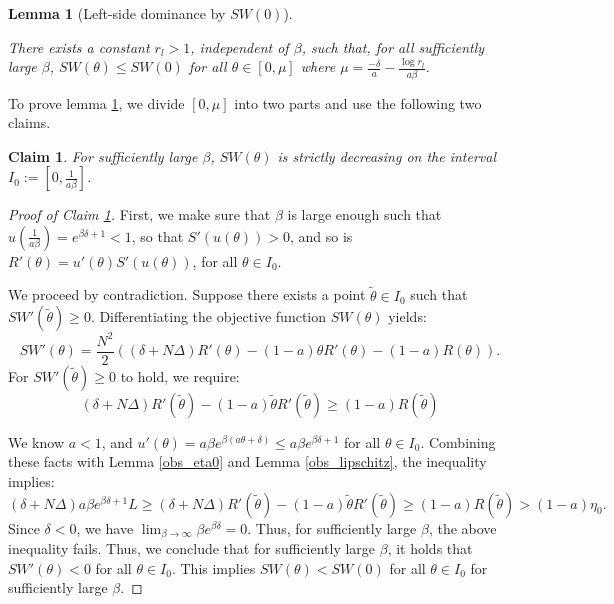 \documentclass{article}
\newtheorem{lemma}{Lemma}
\newtheorem{claim}{Claim}
\newcommand{\md}[1]{{\color{red}Hong:  #1}}
\begin{document}
\begin{lemma}[Left-side dominance by $SW(0)$]
\label{lem:lower_bound_c}

There exists a constant $r_l > 1$, independent of $\beta$, such that, for all sufficiently large $\beta$,  $SW(\theta) \le SW(0)$ for all $\theta \in [0, \mu]$ where $\mu = \frac{-\delta}{a} - \frac{\log r_l}{a\beta}$.
\end{lemma}
To prove lemma \ref{lem:lower_bound_c}, we divide $[0, \mu]$ into two parts and use the following two claims.
\begin{claim} \label{claim:decrease_near_zero}
For sufficiently large $\beta$, $SW(\theta)$ is strictly decreasing on the interval $I_0 := \left[0, \frac{1}{a\beta}\right]$.
\end{claim}
\begin{proof}[Proof of Claim \ref{claim:decrease_near_zero}]
First, we make sure that $\beta$ is large enough such that $u(\frac{1}{a\beta}) = e^{\beta\delta+1} < 1$, so that $S'(u(\theta)) > 0$, and so is $R'(\theta)=u'(\theta)S'(u(\theta))$, for all $\theta \in I_0$.

We proceed by contradiction. Suppose there exists a point $\tilde{\theta} \in I_0$ such that $SW'(\tilde{\theta}) \ge 0$. Differentiating the objective function $SW(\theta)$ yields:
\[ 
SW'(\theta) = \frac{N^2}{2}\left( (\delta + N\Delta)R'(\theta) - (1-a)\theta R'(\theta) - (1-a)R(\theta) \right).
\]
For $SW'(\tilde{\theta}) \ge 0$ to hold, we require:
\[
(\delta + N\Delta)R'(\tilde{\theta}) - (1-a)\tilde{\theta} R'(\tilde{\theta}) \ge (1-a)R(\tilde{\theta})
\]

We know $a < 1$, and $u'(\theta) = a\beta e^{\beta(a\theta + \delta)} \le a\beta e^{\beta \delta + 1}$ for all $\theta \in I_0$. Combining these facts with Lemma \ref{obs_eta0} and Lemma \ref{obs_lipschitz}, the inequality implies:
\[
(\delta + N\Delta)a\beta e^{\beta\delta + 1} L \geq (\delta + N\Delta)R'(\tilde{\theta}) - (1-a)\tilde{\theta} R'(\tilde{\theta}) \ge (1-a) R(\tilde{\theta}) > (1-a)\eta_0.
\]
Since $\delta < 0$, we have  $\lim_{\beta \to \infty} \beta e^{\beta\delta} = 0$. Thus, for sufficiently large $\beta$, the above inequality fails. Thus, we conclude that for sufficiently large $\beta$, it holds that $SW'(\theta) < 0$ for all $\theta \in I_0$. This implies $SW(\theta) < SW(0)$ for all $\theta \in I_0$ for sufficiently large $\beta$.
\end{proof}
\end{document}
